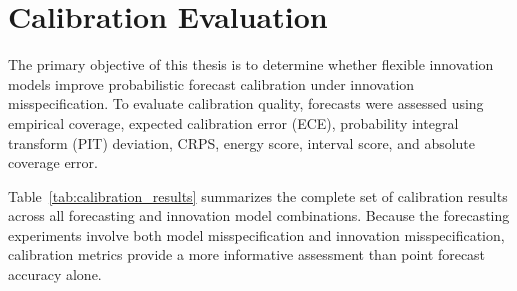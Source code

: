 \documentclass[11pt]{article}
\begin{document}
\section{Calibration Evaluation}

The primary objective of this thesis is to determine whether flexible innovation models improve probabilistic forecast calibration under innovation misspecification. To evaluate calibration quality, forecasts were assessed using empirical coverage, expected calibration error (ECE), probability integral transform (PIT) deviation, CRPS, energy score, interval score, and absolute coverage error.

Table~\ref{tab:calibration_results} summarizes the complete set of calibration results across all forecasting and innovation model combinations. Because the forecasting experiments involve both model misspecification and innovation misspecification, calibration metrics provide a more informative assessment than point forecast accuracy alone.
\end{document}
